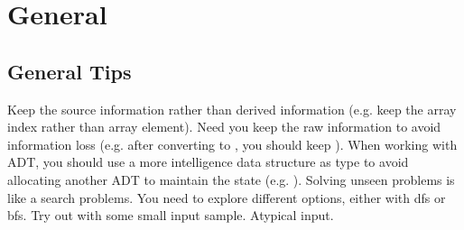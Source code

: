 \chapter{General}
\section{General Tips}
 Keep the source information rather than derived information (e.g. keep the array index rather than array element).
 Need you keep the raw information to avoid information loss (e.g. after converting  to , you should keep ).
 When working with ADT, you should use a more intelligence data structure as type to avoid allocating another ADT to maintain the state (e.g. ). 
 Solving unseen problems is like a search problems. You need to explore different options, either with dfs or bfs.
  Try out with some small input sample.
 Atypical input. 
